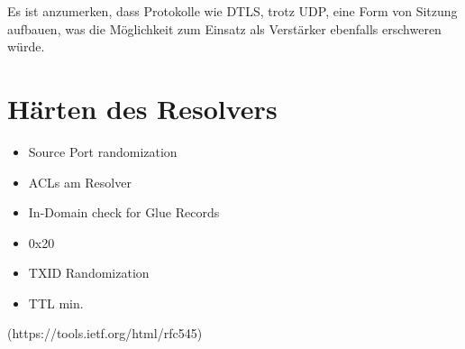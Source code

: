 Es ist anzumerken, dass Protokolle wie DTLS, trotz UDP, eine Form von Sitzung aufbauen, was die Möglichkeit zum Einsatz als Verstärker ebenfalls erschweren würde\cite{rfc6347}. 

\section{Härten des Resolvers}

\begin{draft}
    \begin{itemize}
        \item Source Port randomization
        \item ACLs am Resolver
        \item In-Domain check for Glue Records
        \item 0x20 
        \item TXID Randomization
        \item TTL min. 
    \end{itemize}

(https://tools.ietf.org/html/rfc545)

\end{draft}
